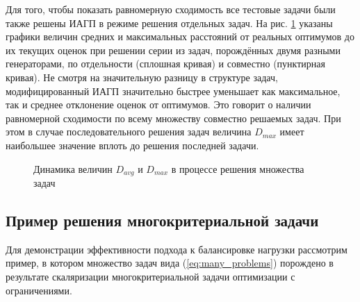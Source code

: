\documentclass[11pt, oneside, a4paper]{article}
\begin{document}
Для того, чтобы показать равномерную сходимость все тестовые задачи были также решены ИАГП
в режиме решения отдельных задач. На рис. \ref{fig:devs_mixed} указаны графики величин
средних и максимальных расстояний от реальных оптимумов до их текущих оценок при решении
серии из задач, порождённых двумя разными генераторами, по отдельности (сплошная кривая) и совместно (пунктирная кривая).
Не смотря на значительную разницу в структуре задач, модифицированный ИАГП
значительно быстрее уменьшает как максимальное, так и среднее отклонение оценок от оптимумов.
Это говорит о наличии равномерной сходимости по всему множеству совместно решаемых задач.
При этом в случае последовательного решения задач величина \(D_{max}\) имеет наибольшее значение вплоть
до решения последней задачи.

\begin{figure}[ht]
    \centering
    \caption{Динамика величин \(D_{avg}\) и \(D_{max}\) в процессе решения множества задач}
    \label{fig:devs_mixed}
\end{figure}

\subsection{Пример решения многокритериальной задачи}

Для демонстрации эффективности подхода к балансировке нагрузки рассмотрим пример,
в котором множество задач вида (\ref{eq:many_problems}) порождено в результате скаляризации
многокритериальной задачи оптимизации с ограничениями.
\end{document}
